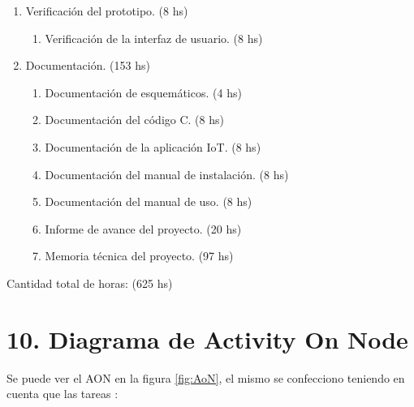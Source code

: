\documentclass[
11pt, %
]{charter}
\begin{document}
\begin{enumerate}
\item Verificación del prototipo. (8 hs)
	\begin{enumerate}
	\item Verificación de la interfaz de usuario. (8 hs)
	\end{enumerate}	
	
\item Documentación. (153 hs)
	\begin{enumerate}
	\item Documentación de esquemáticos. (4 hs)
	\item Documentación del código C. (8 hs)
	\item Documentación de la aplicación IoT. (8 hs)
	\item Documentación del manual de instalación. (8 hs)
	\item Documentación del manual de uso. (8 hs)
	\item Informe de avance del proyecto. (20 hs)
	\item Memoria técnica del proyecto. (97 hs)

	\end{enumerate}


\end{enumerate}

Cantidad total de horas: (625 hs)

\newpage

\section{10. Diagrama de Activity On Node}
\label{sec:AoN}


Se puede ver el AON en la figura \ref{fig:AoN}, el mismo se confecciono teniendo en cuenta que las tareas :
\end{document}
